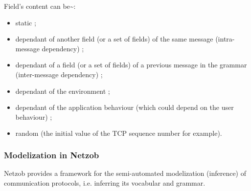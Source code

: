 \documentclass[letterpaper,10pt,english]{sphinxmanual}
\begin{document}
Field's content can be\textasciitilde{}:
\begin{itemize}
\item {} 
static ;

\item {} 
dependant of another field (or a set of fields) of the same message (intra-message dependency) ;

\item {} 
dependant of a field (or a set of fields) of a previous message in the grammar (inter-message dependency) ;

\item {} 
dependant of the environment ;

\item {} 
dependant of the application behaviour (which could depend on the user behaviour) ;

\item {} 
random (the initial value of the TCP sequence number for example).

\end{itemize}


\subsubsection{Modelization in Netzob}
\label{modelization/index:modelization-in-netzob}
Netzob provides a framework for the semi-automated modelization (inference) of communication protocols, i.e. inferring its vocabular and grammar.
\end{document}
